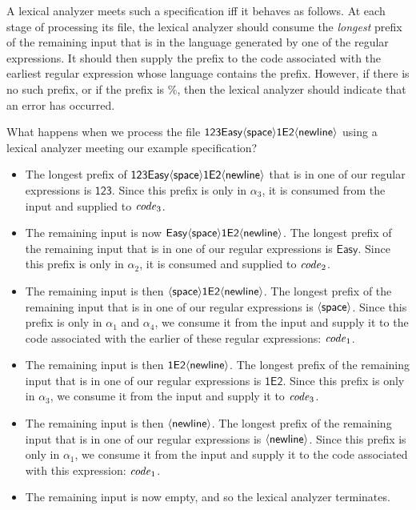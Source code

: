 A lexical analyzer meets such a specification iff it behaves as
follows.  At each stage of processing its file, the lexical analyzer
should consume the \emph{longest} prefix of the remaining input that
is in the language generated by one of the regular expressions.  It
should then supply the prefix to the code associated with the earliest
regular expression whose language contains the prefix.  However, if
there is no such prefix, or if the prefix is $\%$, then the lexical
analyzer should indicate that an error has occurred.

What happens when we process the file $\mathsf{123Easy\mathsf{\langle space\rangle}
  1E2\mathsf{\langle newline\rangle}}$ using a lexical analyzer meeting our example
specification?
\begin{itemize}
\item The longest prefix of $\mathsf{123Easy\mathsf{\langle space\rangle} 1E2\mathsf{\langle newline\rangle}}$
  that is in one of our regular expressions is $\mathsf{123}$.  Since
  this prefix is only in $\alpha_3$, it is consumed from the input and
  supplied to ${\it code}_3$.

\item The remaining input is now $\mathsf{Easy\mathsf{\langle space\rangle}
    1E2\mathsf{\langle newline\rangle}}$.  The longest prefix of the remaining input that
  is in one of our regular expressions is $\mathsf{Easy}$.  Since this
  prefix is only in $\alpha_2$, it is consumed and supplied to
  ${\it code}_2$.

\item The remaining input is then $\mathsf{\mathsf{\langle space\rangle} 1E2\mathsf{\langle newline\rangle}}$.
  The longest prefix of the remaining input that is in one of our
  regular expressions is $\mathsf{\langle space\rangle}$.  Since this prefix is only in
  $\alpha_1$ and $\alpha_4$, we consume it from the input and supply
  it to the code associated with the earlier of these regular
  expressions: ${\it code}_1$.

\item The remaining input is then $\mathsf{1E2\mathsf{\langle newline\rangle}}$.  The
  longest prefix of the remaining input that is in one of our regular
  expressions is $\mathsf{1E2}$.  Since this prefix is only in
  $\alpha_3$, we consume it from the input and supply it to ${\it code}_3$.

\item The remaining input is then $\mathsf{\mathsf{\langle newline\rangle}}$.  The longest
  prefix of the remaining input that is in one of our regular
  expressions is $\mathsf{\langle newline\rangle}$.  Since this prefix is only in
  $\alpha_1$, we consume it from the input and supply it to the code
  associated with this expression: ${\it code}_1$.

\item The remaining input is now empty, and so the lexical analyzer
  terminates.
\end{itemize}

